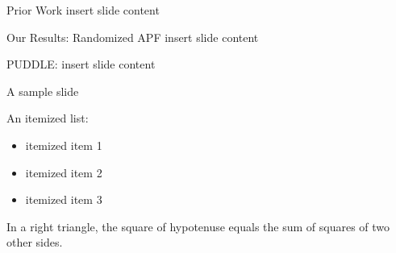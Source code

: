 \documentclass{beamer}
\begin{document}
\begin{frame}{Prior Work}
	insert slide content	
\end{frame}

\begin{frame}{Our Results: Randomized APF}
	insert slide content
\end{frame}

\begin{frame}{PUDDLE: }
	insert slide content
\end{frame}

\begin{frame}{A sample slide}



An itemized list:

\begin{itemize}
  \item itemized item 1
  \item itemized item 2
  \item itemized item 3
\end{itemize}

\begin{theorem}
  In a right triangle, the square of hypotenuse equals
  the sum of squares of two other sides.
\end{theorem}

\end{frame}
\end{document}
